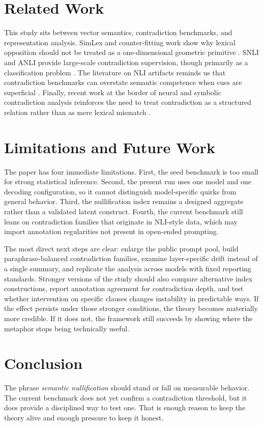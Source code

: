 \documentclass{svjour3}
\begin{document}
\section{Related Work}
This study sits between vector semantics, contradiction benchmarks, and representation analysis. SimLex and counter-fitting work show why lexical opposition should not be treated as a one-dimensional geometric primitive \citep{hill2015simlex,mrksic2016counterfitting}. SNLI and ANLI provide large-scale contradiction supervision, though primarily as a classification problem \citep{bowman2015snli,nie2019anli}. The literature on NLI artifacts reminds us that contradiction benchmarks can overstate semantic competence when cues are superficial \citep{gururangan2018artifacts}. Finally, recent work at the border of neural and symbolic contradiction analysis reinforces the need to treat contradiction as a structured relation rather than as mere lexical mismatch \citep{feng2024neurosymbolic}.

\section{Limitations and Future Work}
The paper has four immediate limitations. First, the seed benchmark is too small for strong statistical inference. Second, the present run uses one model and one decoding configuration, so it cannot distinguish model-specific quirks from general behavior. Third, the nullification index remains a designed aggregate rather than a validated latent construct. Fourth, the current benchmark still leans on contradiction families that originate in NLI-style data, which may import annotation regularities not present in open-ended prompting.

The most direct next steps are clear: enlarge the public prompt pool, build paraphrase-balanced contradiction families, examine layer-specific drift instead of a single summary, and replicate the analysis across models with fixed reporting standards. Stronger versions of the study should also compare alternative index constructions, report annotation agreement for contradiction depth, and test whether intervention on specific clauses changes instability in predictable ways. If the effect persists under those stronger conditions, the theory becomes materially more credible. If it does not, the framework still succeeds by showing where the metaphor stops being technically useful.

\section{Conclusion}
The phrase \emph{semantic nullification} should stand or fall on measurable behavior. The current benchmark does not yet confirm a contradiction threshold, but it does provide a disciplined way to test one. That is enough reason to keep the theory alive and enough pressure to keep it honest.
\end{document}
